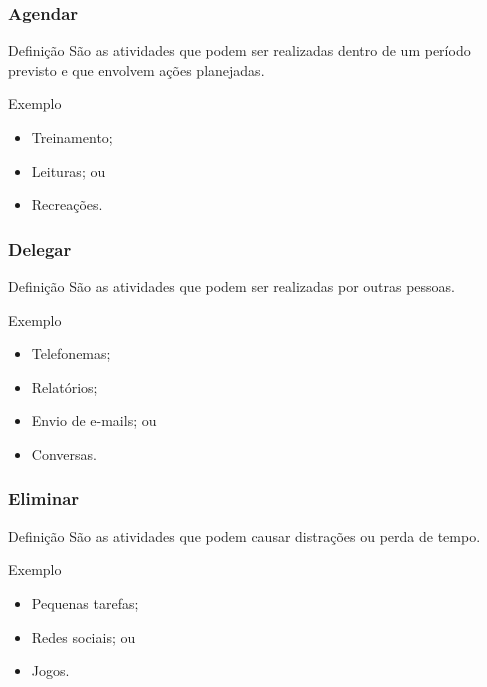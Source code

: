 \documentclass[aspectratio=169]{beamer}
\begin{document}
\begin{frame}
	\frametitle{Agendar}

	\begin{block}{Defini\c cão}
		 São as atividades que podem ser realizadas dentro de um período previsto e que envolvem a\c cões planejadas.
	\end{block}\vfill

	\begin{exampleblock}{Exemplo}
		\begin{itemize}
		 	\item Treinamento;
			\item Leituras; ou
			\item Recrea\c cões.
		\end{itemize}
	\end{exampleblock}
\end{frame}

\begin{frame}
	\frametitle{Delegar}

	\begin{block}{Defini\c cão}
		 São as atividades que podem ser realizadas por outras pessoas.
	\end{block}\vfill

	\begin{exampleblock}{Exemplo}
		\begin{itemize}
		 	\item Telefonemas;
			\item Relatórios;
			\item Envio de e-mails; ou
			\item Conversas.
		\end{itemize}
	\end{exampleblock}
\end{frame}

\begin{frame}
	\frametitle{Eliminar}

	\begin{block}{Defini\c cão}
		 São as atividades que podem causar distra\c cões ou perda de tempo.
	\end{block}\vfill

	\begin{exampleblock}{Exemplo}
		\begin{itemize}
		 	\item Pequenas tarefas;
			\item Redes sociais; ou
			\item Jogos.
		\end{itemize}
	\end{exampleblock}
\end{frame}
\end{document}
